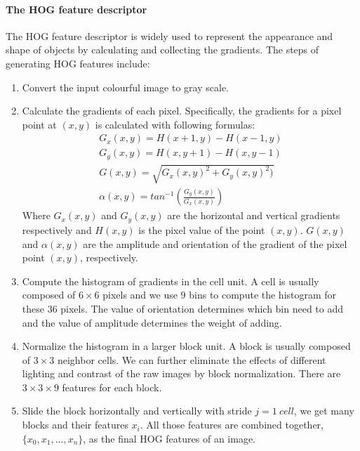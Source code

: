 \paragraph*{The HOG feature descriptor}
The HOG feature descriptor is widely used to represent the appearance and shape of objects by calculating and collecting the gradients. The steps of generating HOG features include:
\begin{enumerate}
	\item Convert the input colourful image to gray scale.
	\item Calculate the gradients of each pixel. Specifically, the gradients for a pixel point at \((x,y)\) is calculated with following formulas:
	\begin{eqnarray}
		G_x(x,y) = H(x+1,y) - H(x-1,y) \\
		G_y(x,y) = H(x,y+1) - H(x,y-1) \\
		G(x,y) = \sqrt{G_x(x,y)^2 + G_y(x,y)^2)} \\
		\alpha(x,y) = tan^{-1}(\frac{G_y(x,y)}{G_x(x,y)})
	\end{eqnarray}
	Where \(G_x(x,y)\) and \(G_y(x,y)\) are the horizontal and vertical gradients respectively and \(H(x,y)\) is the pixel value of the point \((x,y)\). \(G(x,y)\) and \(\alpha(x,y)\) are the amplitude and orientation of the gradient of the pixel point \((x,y)\), respectively.
	
	\item Compute the histogram of gradients in the cell unit. A cell is usually composed of \(6 \times 6\) pixels and we use \(9\) bins to compute the histogram for these \(36\) pixels. The value of orientation determines which bin need to add and the value of amplitude determines the weight of adding.
	
	\item Normalize the histogram in a larger block unit. A block is usually composed of \(3 \times 3 \)  neighbor cells.  We can further eliminate the effects of different lighting and contrast of the raw images by block normalization.  There are \(3 \times 3 \times 9 \) features for each block.
	
	\item Slide the block horizontally and vertically with stride \(j=1\ cell\), we get many blocks and their features \(x_i\). All those features are combined together, \(\{x_0, x_1,...,x_n\}\), as the final HOG features of an image.
\end{enumerate}

